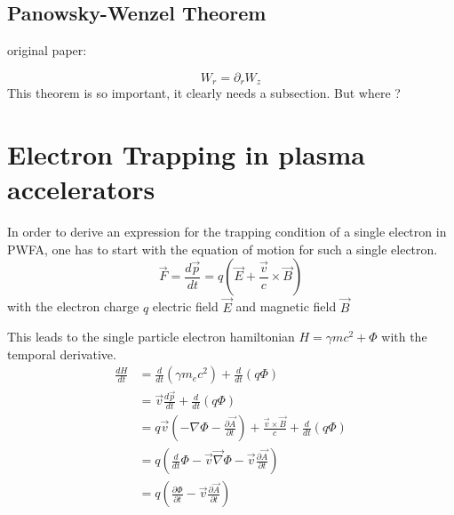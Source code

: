 \subsection{Panowsky-Wenzel Theorem}

original paper:  \cite{Panowsky_Wenzel_original}

 \begin{equation}
W_r =\partial_r W_z
\end{equation} 
This theorem is so important, it clearly needs a subsection. But where ?


\section{Electron Trapping in plasma accelerators}

In order to derive an expression for the trapping condition of a single electron in PWFA, one has to start with the equation of motion for such a single electron. 
\begin{equation}
\vec{F}=\frac{d\vec{p}}{dt}=q(\vec{E}+\frac{\vec{v}}{c}\times\vec{B})
\end{equation}
with the electron charge $q$ electric field $\vec{E}$ and magnetic field $\vec{B}$

This leads to the single particle electron hamiltonian $ H=\gamma m c^2+\Phi$ with the temporal derivative.
\begin{align}
\frac{dH}{dt}&=\frac{d}{dt} (\gamma m_e c^2)+\frac{d}{dt}(q\Phi)\\
&=\vec{v}\frac{d\vec{p}}{dt}+\frac{d}{dt}(q\Phi)\\
&=q\vec{v}(-\nabla \Phi-\frac{\partial \vec{A}}{\partial t})+\frac{\vec{v}\times\vec{B}}{c}+\frac{d}{dt}(q\Phi)\\
&=q(\frac{d}{dt}\Phi-\vec{v}\vec{\nabla}\Phi-\vec{v}\frac{\partial \vec{A}}{\partial t})\\
&=q(\frac{\partial \Phi}{\partial t}-\vec{v}\frac{\partial \vec{A}}{\partial t})
\end{align}

